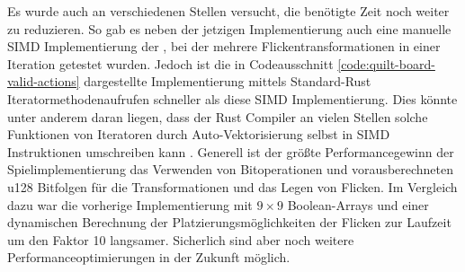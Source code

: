 Es wurde auch an verschiedenen Stellen versucht, die benötigte Zeit noch weiter zu reduzieren. So gab es neben der jetzigen Implementierung auch eine manuelle \ac{SIMD} Implementierung der , bei der mehrere Flickentransformationen in einer Iteration getestet wurden. Jedoch ist die in Codeausschnitt \ref{code:quilt-board-valid-actions} dargestellte Implementierung mittels Standard-Rust Iteratormethodenaufrufen schneller als diese \ac{SIMD} Implementierung. Dies könnte unter anderem daran liegen, dass der Rust Compiler an vielen Stellen solche Funktionen von Iteratoren durch Auto-Vektorisierung selbst in \ac{SIMD} Instruktionen umschreiben kann \cite{2020.RustAutoVectorization}. Generell ist der größte Performancegewinn der Spielimplementierung das Verwenden von Bitoperationen und vorausberechneten \ac{u128} Bitfolgen für die Transformationen und das Legen von Flicken. Im Vergleich dazu war die vorherige Implementierung mit $9\times 9$ Boolean-Arrays und einer dynamischen Berechnung der Platzierungsmöglichkeiten der Flicken zur Laufzeit um den Faktor 10 langsamer. Sicherlich sind aber noch weitere Performanceoptimierungen in der Zukunft möglich.